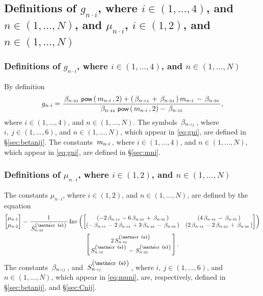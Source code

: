 \documentclass[preprint,12pt,times]{elsarticle}
\numberwithin{equation}{section}
\newcommand{\physe}{\hat{\mathscr{e}}} %
\newcommand{\pr}[1]{\left( #1 \right)}
\newcommand{\p}{\,\textsf{\small pow}}
\newcommand{\Inv}{\,\mathrm{Inv}}
\newcommand{\msub}[2]{
\IfEqCase{#2}{
      {i}{\, m_{#1\cdot #2}\,}%
  }[\,m_{#1\cdot {\scriptscriptstyle #2}}\,]}
\newcommand{\gsub}[2]{g_{#1\cdot #2}}
\newcommand{\musub}[2]{\mu_{#1\cdot #2}}
\newcommand{\betasub}[2]{
\IfEqCase{#2}{
       {xxxx}{\,\beta_{ {#1}\cdot { #2}}\,}%
   }[\,\beta_{ {#1}\cdot {\scriptscriptstyle #2}}\,]}
\newcommand{\Csub}[2]{
   \IfEqCase{#2}{
          {xxxx}{\,\beta_{ {#1}\cdot { #2}}\,}%
      }[\,S^{\pr{\physe}}_{ {#1}\cdot {\scriptscriptstyle #2}}\,]}
\newcommand{\intwo}{\in(1,2)}
\newcommand{\infour}{\in(1,\ldots,4)}
\newcommand{\insix}{\in(1,\ldots,6)}
\newcommand{\inN}{\in(1,\ldots,N)}
\renewcommand{\>}{$\Rightarrow$}
\begin{document}
\subsection{Definitions of $\gsub{n}{i}$, where $i\infour$, and $n\inN$, and $\musub{n}{i}$, $i\intwo $, and $n\inN$}
\label{sec:gmuni}%

\subsubsection{Definitions of $\gsub{n}{i}$, where $i\infour$, and $n\inN$}
\label{sec:gni}%

By definition
	\begin{equation}
	\gsub{n}{i} = \frac{\betasub{n}{24}\p\pr{\msub{n}{i},2}+(\betasub{n}{14} + \betasub{n}{24})\msub{n}{i} - \betasub{n}{56}}{\betasub{n}{44}\p\pr{\msub{n}{i},2} - \betasub{n}{55}},
\label{eq:gni}
	\end{equation}
where $i\infour$, and $n\inN$. %
The symbols $\betasub{n}{ij}$, where $i,~j\insix$, and $n\inN$, which appear in \eqref{eq:gni}, are defined in \S\ref{sec:betanij}.%
The constants $\msub{n}{i}$, where $i\infour$, and $n\inN$, which appear in \eqref{eq:gni}, are defined in \S\ref{sec:mni}.%



\subsubsection{Definitions of $\musub{n}{i}$, where $i\in (1,2)$, and $n\in (1,\ldots,N)$}%
\label{sec:muni}

The constants $\musub{n}{i}$, where $i\in (1,2)$, and $n\in (1,\ldots,N)$, are defined by the equation
	\begin{multline}
	\begin{bmatrix}
		\musub{n}{1} \\ \musub{n}{2}
	\end{bmatrix} =
	\frac{1}{\Csub{n}{33}}
	\Inv \pr{\begin{bmatrix}
		\pr{-2\betasub{n}{14}-6\betasub{n}{24}+\betasub{n}{56}} & \pr{4\betasub{n}{44}-\betasub{n}{55}} \\
		\pr{-\betasub{n}{11}-2\betasub{n}{12}+3\betasub{n}{22}-\betasub{n}{66}} & \pr{2\betasub{n}{14}-2\betasub{n}{24}+\betasub{n}{56}}
	\end{bmatrix}}\\ 
	\begin{bmatrix}
			2\Csub{n}{34} \\ \Csub{n}{13}-\Csub{n}{23}
	\end{bmatrix}.
\label{eq:muni}	
\end{multline} %
The constants $\betasub{n}{ij}$, and $\Csub{n}{ij}$, where $i,~j\insix$, and $n\inN$, which appear in \eqref{eq:muni}, are, respectively, defined in \S\ref{sec:betanij}, and \S\ref{sec:Cnij}. %
\end{document}

